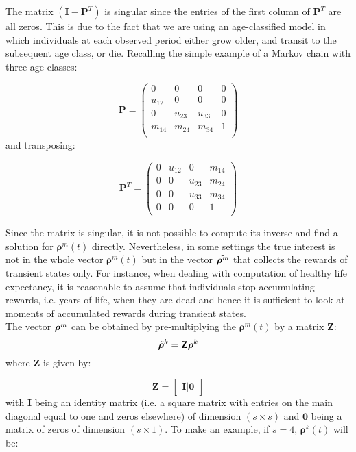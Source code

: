 \documentclass[\main/main.tex]{subfiles}
\begin{document}
The matrix $( \mathbf{I} - \mathbf{P}^T)$ is singular since the entries of the first column of $\mathbf{P}^T$ are all zeros. This is due to the fact that we are using an age-classified model in which individuals at each observed period either grow older, and transit to the subsequent age class, or die. Recalling the simple example of a Markov chain with three age classes:

\begin{equation}
    \mathbf{P}= \begin{pmatrix}
    0 & 0 & 0 & 0\\
    u_{12} & 0 & 0& 0\\
0 & u_{23} & u_{33}& 0\\
m_{14} & m_{24} & m_{34}& 1\\
    \end{pmatrix}
\end{equation}
and transposing:

\begin{equation}
    \mathbf{P}^T= \begin{pmatrix}
    0 &  u_{12} & 0 & m_{14}\\
    0 & 0 & u_{23} & m_{24}\\
    0 & 0 & u_{33} & m_{34}\\
    0 & 0 & 0 &1\\
    \end{pmatrix}
\end{equation}

Since the matrix is singular, it is not possible to compute its inverse and find a solution for $ \bm{\rho}^m(t) $ directly. Nevertheless, in some settings the true interest is not in the whole vector $ \bm{\rho}^m(t) $ but in the vector $\Tilde{\bm{\rho}^m}$ that collects  the  rewards  of transient states only.
For instance, when dealing with computation of healthy life expectancy, it is reasonable to assume that individuals stop accumulating rewards, i.e. years of life, when they are dead and hence it is sufficient to look at moments of accumulated rewards during transient states.\\
The vector $\Tilde{\bm{\rho}^m}$ can be obtained by pre-multiplying the  $ \bm{\rho}^m(t) $ by a matrix $\mathbf{Z}$:
\begin{equation}
    \Tilde{\bm{\rho}}^k = \mathbf{Z}\bm{\rho}^k
\end{equation}
where $\mathbf{Z}$ is given by:

\begin{equation}
\mathbf{Z}=
    \begin{bmatrix}
    \mathbf{I} | \mathbf{0}
    \end{bmatrix}
\end{equation}
with $\mathbf{I}$ being an identity matrix (i.e. a square matrix with entries on the main diagonal equal to one and zeros elsewhere)  of dimension $(s \times s) $ and $\mathbf{0}$ being a matrix of zeros of dimension $(s \times 1) $.
To make an example, if $s = 4$,  $\bm{\rho}^k(t)$ will be:
\end{document}
